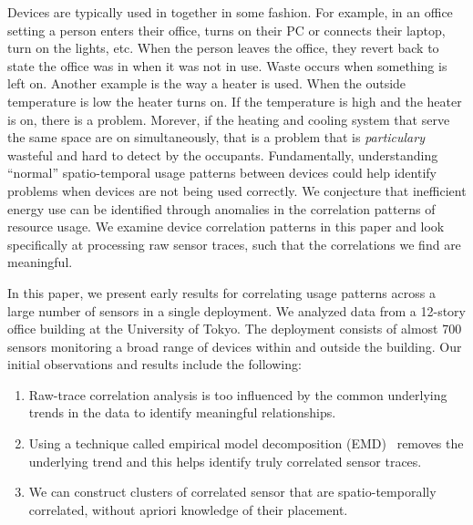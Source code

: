 Devices are typically used in together in some fashion.  For example, in an office
setting a person enters their office, turns on their PC or connects their laptop, turn on the lights, etc.
When the person leaves the office, they revert back to state the office was in when it was
not in use.  Waste occurs when something is left on.  Another example is the way a heater is used.  
When the outside temperature is low the heater turns on.  If the temperature is high and the heater is on, there
is a problem.  Morever, if the heating and cooling system that serve the same space are on simultaneously, that
is a problem that is \emph{particulary} wasteful and hard to detect by the occupants.  
Fundamentally, understanding ``normal'' spatio-temporal usage patterns between devices could help
identify problems when devices are not being used correctly. %
We conjecture that inefficient energy use can be identified through anomalies in the correlation
patterns of resource usage.  We examine device correlation patterns in this paper and look specifically
at processing raw sensor traces, such that the correlations we find are meaningful.


 

In this paper, we present early results for correlating usage patterns across a large number of sensors
in a single deployment.  We analyzed data from a 12-story office building at the University of Tokyo.  
The deployment consists of almost 700 sensors monitoring a broad range of devices within and outside 
the building.  Our initial observations and results include the following:

\begin{enumerate}
\item Raw-trace correlation analysis is too influenced by the common underlying trends in the data
	to identify meaningful relationships.
\item Using a technique called empirical model decomposition (EMD)~\cite{huang:emd1998} removes the 
		underlying trend and this helps identify truly correlated sensor traces.
\item We can construct clusters of correlated sensor that are spatio-temporally correlated, without
		apriori knowledge of their placement.
\end{enumerate}

